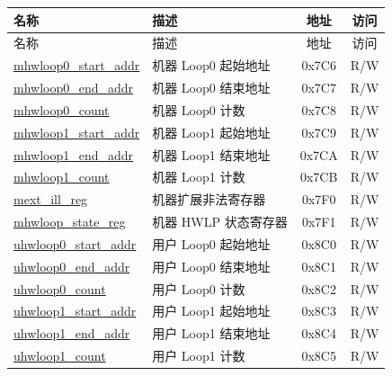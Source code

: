 \begin{longtable}{ | p{4.0cm} | p{8.4cm} | c | c| }
\hline\rowcolor{lightgray}
名称 & 描述 & 地址 & 访问 \\ \hline
\endfirsthead
\hline
\rowcolor{lightgray}
名称 & 描述 & 地址 & 访问\\
\hline
\endhead
\endfoot
\hyperref[sec:riscvcpu-hwloop-reg-desc]{mhwloop0\_start\_addr} & 机器 Loop0 起始地址 & 0x7C6 & R/W \\\hline
\hyperref[sec:riscvcpu-hwloop-reg-desc]{mhwloop0\_end\_addr} & 机器 Loop0 结束地址 & 0x7C7 & R/W \\\hline
\hyperref[sec:riscvcpu-hwloop-reg-desc]{mhwloop0\_count} & 机器 Loop0 计数 & 0x7C8 & R/W \\\hline
\hyperref[sec:riscvcpu-hwloop-reg-desc]{mhwloop1\_start\_addr} & 机器 Loop1 起始地址 & 0x7C9 & R/W \\\hline
\hyperref[sec:riscvcpu-hwloop-reg-desc]{mhwloop1\_end\_addr} & 机器 Loop1 结束地址 & 0x7CA & R/W \\\hline
\hyperref[sec:riscvcpu-hwloop-reg-desc]{mhwloop1\_count} & 机器 Loop1 计数 & 0x7CB & R/W \\\hline
\hyperref[sec:riscvcpu-hwloop-reg-desc]{mext\_ill\_reg} & 机器扩展非法寄存器 & 0x7F0 & R/W \\\hline
\hyperref[sec:riscvcpu-hwloop-reg-desc]{mhwloop\_state\_reg} & 机器 HWLP 状态寄存器 & 0x7F1 & R/W \\\hline
\hyperref[sec:riscvcpu-hwloop-reg-desc]{uhwloop0\_start\_addr} & 用户 Loop0 起始地址 & 0x8C0 & R/W \\\hline
\hyperref[sec:riscvcpu-hwloop-reg-desc]{uhwloop0\_end\_addr} & 用户 Loop0 结束地址 & 0x8C1 & R/W \\\hline
\hyperref[sec:riscvcpu-hwloop-reg-desc]{uhwloop0\_count} & 用户 Loop0 计数 & 0x8C2 & R/W \\\hline
\hyperref[sec:riscvcpu-hwloop-reg-desc]{uhwloop1\_start\_addr} & 用户 Loop1 起始地址 & 0x8C3 & R/W \\\hline
\hyperref[sec:riscvcpu-hwloop-reg-desc]{uhwloop1\_end\_addr} & 用户 Loop1 结束地址 & 0x8C4 & R/W \\\hline
\hyperref[sec:riscvcpu-hwloop-reg-desc]{uhwloop1\_count} & 用户 Loop1 计数 & 0x8C5 & R/W \\\hline

\end{longtable}
